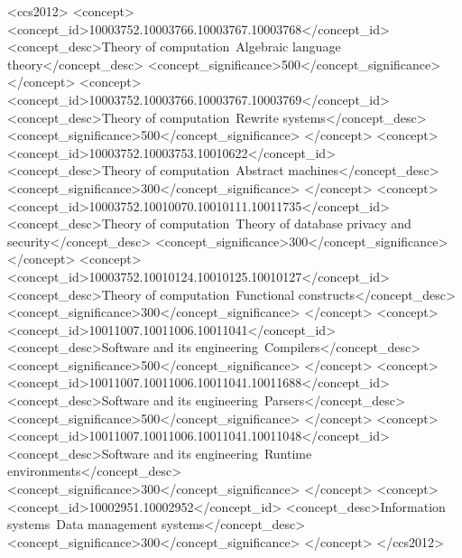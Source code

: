 \documentclass[acmsmall]{acmart}
\begin{document}
\begin{CCSXML}
<ccs2012>
<concept>
<concept_id>10003752.10003766.10003767.10003768</concept_id>
<concept_desc>Theory of computation~Algebraic language theory</concept_desc>
<concept_significance>500</concept_significance>
</concept>
<concept>
<concept_id>10003752.10003766.10003767.10003769</concept_id>
<concept_desc>Theory of computation~Rewrite systems</concept_desc>
<concept_significance>500</concept_significance>
</concept>
<concept>
<concept_id>10003752.10003753.10010622</concept_id>
<concept_desc>Theory of computation~Abstract machines</concept_desc>
<concept_significance>300</concept_significance>
</concept>
<concept>
<concept_id>10003752.10010070.10010111.10011735</concept_id>
<concept_desc>Theory of computation~Theory of database privacy and security</concept_desc>
<concept_significance>300</concept_significance>
</concept>
<concept>
<concept_id>10003752.10010124.10010125.10010127</concept_id>
<concept_desc>Theory of computation~Functional constructs</concept_desc>
<concept_significance>300</concept_significance>
</concept>
<concept>
<concept_id>10011007.10011006.10011041</concept_id>
<concept_desc>Software and its engineering~Compilers</concept_desc>
<concept_significance>500</concept_significance>
</concept>
<concept>
<concept_id>10011007.10011006.10011041.10011688</concept_id>
<concept_desc>Software and its engineering~Parsers</concept_desc>
<concept_significance>500</concept_significance>
</concept>
<concept>
<concept_id>10011007.10011006.10011041.10011048</concept_id>
<concept_desc>Software and its engineering~Runtime environments</concept_desc>
<concept_significance>300</concept_significance>
</concept>
<concept>
<concept_id>10002951.10002952</concept_id>
<concept_desc>Information systems~Data management systems</concept_desc>
<concept_significance>300</concept_significance>
</concept>
</ccs2012>
\end{CCSXML}


\end{document}
